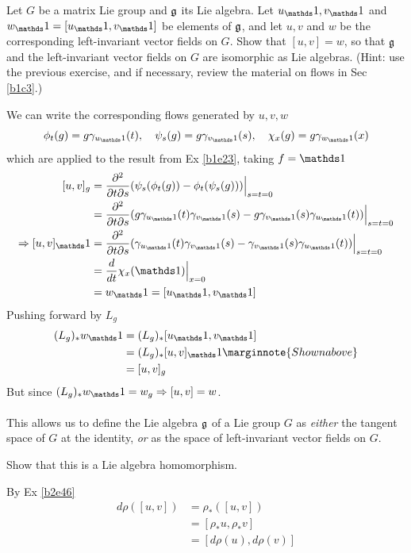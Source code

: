 \documentclass[10pt]{article}
\begin{document}
\begin{example}
	Let $G$ be a matrix Lie group and $\mathfrak{g}$ its Lie algebra. Let $u_\id,v_\id$ and $w_\id=[u_\id,v_\id]$ be elements of $\mathfrak{g}$, and let $u,v$ and $w$ be the corresponding left-invariant vector fields on $G$. Show that $[u,v]=w$, so that $\mathfrak{g}$ and the left-invariant vector fields on $G$ are isomorphic as Lie algebras. (Hint: use the previous exercise, and if necessary, review the material on flows in Sec \ref{b1c3}.)
\end{example}
\sol We can write the corresponding flows generated by $u,v,w$
$$
\phi_t(g)=g\gamma_{u_\id}(t), \quad \psi_s(g)=g\gamma_{v_\id}(s), \quad \chi_x(g)=g\gamma_{w_\id}(x)
$$
which are applied to the result from Ex \ref{b1e23}, taking $f = \id$
$$
\begin{aligned}
	[u,v]_g &= \frac{\partial^2}{\partial t\partial s}(\psi_s(\phi_t(g)) - \phi_t(\psi_s(g)))\Big|_{s=t=0}\\
	&= \frac{\partial^2}{\partial t\partial s}(g\gamma_{u_\id}(t)\gamma_{v_\id}(s)- g\gamma_{v_\id}(s)\gamma_{u_\id}(t))\Big|_{s=t=0}\\
	\Rightarrow [u,v]_\id &= \frac{\partial^2}{\partial t\partial s}(\gamma_{u_\id}(t)\gamma_{v_\id}(s)- \gamma_{v_\id}(s)\gamma_{u_\id}(t))\Big|_{s=t=0}\\
	&= \frac{d}{dt}\chi_x(\id)\Big|_{x=0}\\
	&= w_\id = [u_\id,v_\id]
\end{aligned}
$$
Pushing forward by $L_g$
$$
\begin{aligned}
	(L_g)_*w_\id &= (L_g)_*[u_\id,v_\id]\\
	&= (L_g)_*[u,v]_\id\marginnote{Shown above}\\
	&= [u,v]_g
\end{aligned}
$$
But since $(L_g)_*w_\id = w_g \Rightarrow [u,v] = w$.\\\\
This allows us to define the Lie algebra $\mathfrak{g}$ of a Lie group $G$ as \emph{either} the tangent space of $G$ at the identity, \emph{or} as the space of left-invariant vector fields on $G$.


\begin{example}
	Show that this is a Lie algebra homomorphism.
\end{example}
\sol By Ex \ref{b2e46}
$$
\begin{aligned}
	d\rho([u,v]) &= \rho_*([u,v])\\
	&= [\rho_*u,\rho_*v]\\
	&= [d\rho (u),d\rho (v)]
\end{aligned}
$$
\end{document}
